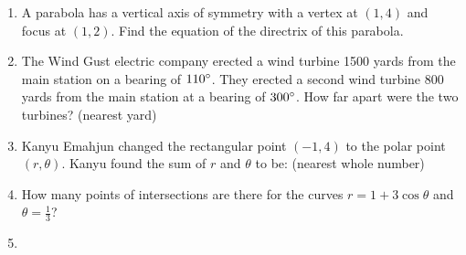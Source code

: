 \documentclass[../uilmath.tex]{subfiles}
\begin{document}
\begin{enumerate}[label=\bfseries\arabic*.]
    \item %
    A parabola has a vertical axis of symmetry with a vertex at $(1,4)$ and focus at $(1,2)$. Find the equation of the directrix of this parabola.

    \item %
    The Wind Gust electric company erected a wind turbine 1500 yards from the main station on a bearing of $110\degree$. They erected a second wind turbine 800 yards from the main station at a bearing of $300\degree$. 
    How far apart were the two turbines? (nearest yard)

    \item %
    Kanyu Emahjun changed the rectangular point $(-1,4)$ to the polar point $(r,\theta)$. Kanyu found the sum of $r$ and $\theta$ to be: (nearest whole number)

    \item %
    How many points of intersections are there for the curves $r=1+3\cos\theta$ and $\theta=\frac{1}{3}$?

    \item %
    

\end{enumerate}
\end{document}
